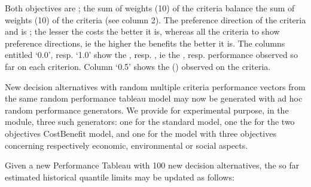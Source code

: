 \documentclass[a4paper,10pt,english]{sphinxhowto}
\begin{document}
\begin{sphinxVerbatim}[commandchars=\\\{\},numbers=left,firstnumber=1,stepnumber=1]
\end{sphinxVerbatim}

Both objectives are ; the sum of weights (10) of the  criteria balance the sum of weights (10) of the  criteria (see column 2). The preference direction of the  criteria  and  is ; the lesser the costs the better it is, whereas all the  criteria  to  show  preference directions, ie the higher the benefits the better it is. The columns entitled ‘0.0’, resp. ‘1.0’ show the  , resp. , ie the , resp.  performance observed so far on each criterion. Column ‘0.5’ shows the  () observed on the criteria.

New  decision alternatives with random multiple criteria performance vectors from the same random performance tableau model may now be generated with ad hoc random performance generators. We provide for experimental purpose, in the  module, three such generators: one for the standard  model, one the for the two objectives  Cost\sphinxhyphen{}Benefit model, and one for the  model with three objectives concerning respectively  economic, environmental or social aspects.

Given a new Performance Tableau with 100 new decision alternatives, the so far estimated historical quantile limits may be updated as follows:
\end{document}
